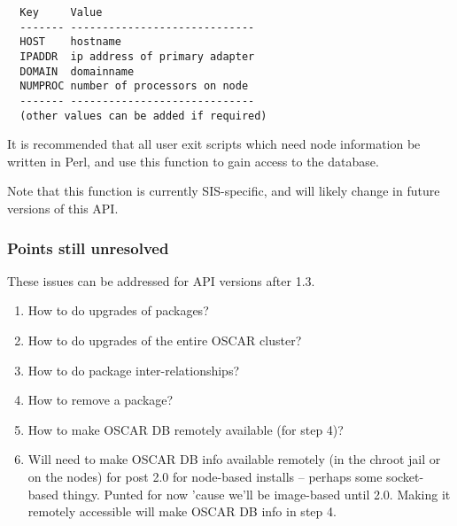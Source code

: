 \begin{verbatim}
  Key     Value
  ------- -----------------------------
  HOST    hostname
  IPADDR  ip address of primary adapter
  DOMAIN  domainname
  NUMPROC number of processors on node
  ------- -----------------------------
  (other values can be added if required)
\end{verbatim}

It is recommended that all user exit scripts which need node
information be written in Perl, and use this function to gain access
to the database.

Note that this function is currently SIS-specific, and will likely
change in future versions of this API.


\subsubsection{Points still unresolved}

These issues can be addressed for API versions after 1.3.

\begin{enumerate}
\item How to do upgrades of packages?
\item How to do upgrades of the entire OSCAR cluster?
\item How to do package inter-relationships?
\item How to remove a package?
\item How to make OSCAR DB remotely available (for step 4)?

\item Will need to make OSCAR DB info available remotely (in the chroot
    jail or on the nodes) for post 2.0 for node-based installs --
    perhaps some socket-based thingy.  Punted for now 'cause we'll be
    image-based until 2.0.  Making it remotely accessible will make
    OSCAR DB info in step 4.
\end{enumerate}

